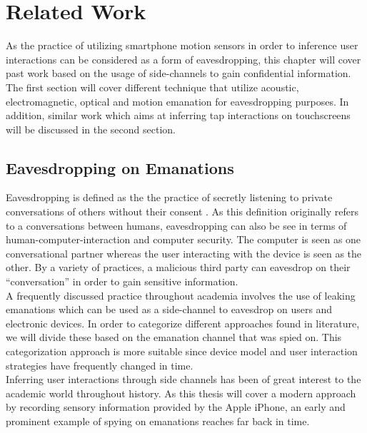 \chapter{Related Work\label{cha:chapter2}}
As the practice of utilizing smartphone motion sensors in order to inference user interactions can be considered as a form of eavesdropping, this chapter will cover past work based on the usage of side-channels to gain confidential information. The first section will cover different technique that utilize acoustic, electromagnetic, optical and motion emanation for eavesdropping purposes. In addition, similar work which aims at inferring tap interactions on touchscreens will be discussed in the second section.

\section{Eavesdropping on Emanations}

Eavesdropping is defined as the the practice of secretly listening to private conversations of others without their consent \cite{black1990black}. As this definition originally refers to a conversations between humans, eavesdropping can also be see in terms of human-computer-interaction and computer security. The computer is seen as one conversational partner whereas the user interacting with the device is seen as the other. By a variety of practices, a malicious third party can eavesdrop on their ``conversation'' in order to gain sensitive information. \\

A frequently discussed practice throughout academia involves the use of leaking emanations which can be used as a side-channel to eavesdrop on users and electronic devices. In order to categorize different approaches found in literature, we will divide these based on the emanation channel that was spied on. This categorization approach is more suitable since device model and user interaction strategies have frequently changed in time. \\

Inferring user interactions through side channels has been of great interest to the academic world throughout history. As this thesis will cover a modern approach by recording sensory information provided by the Apple iPhone, an early and prominent example of spying on emanations reaches far back in time. \\

